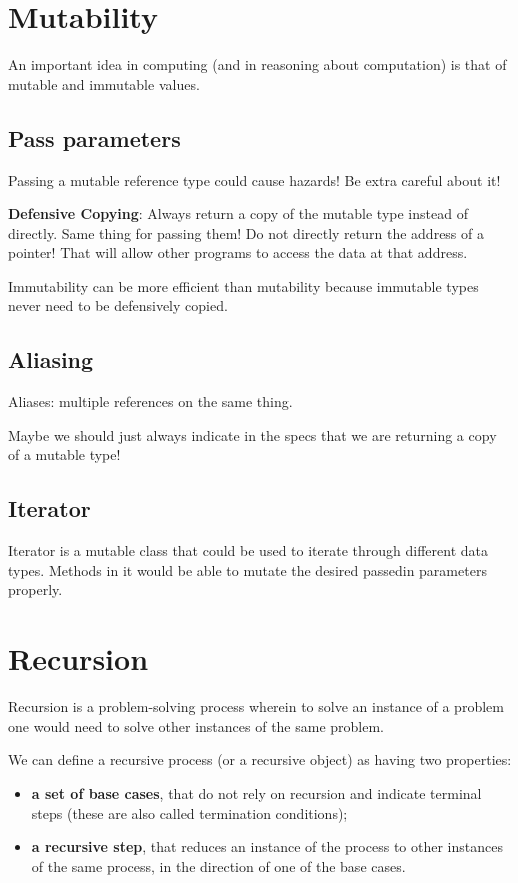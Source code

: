\documentclass[letterpaper,12pt]{article}
\begin{document}
\section{Mutability}
An important idea in computing (and in reasoning about computation) is that of
mutable and immutable values.
\subsection{Pass parameters}
Passing a mutable reference type could cause hazards! Be extra careful about
it!

\textbf{Defensive Copying}: Always return a copy of the mutable type instead of directly. Same thing for passing them!
Do not directly return the address of a pointer! That will allow other programs to access the data at that address.

Immutability can be more efficient than mutability because immutable types
never need to be defensively copied.

\subsection{Aliasing}

Aliases: multiple references on the same thing.

Maybe we should just always indicate in the specs that we are returning a copy
of a mutable type!

\subsection{Iterator}

Iterator is a mutable class that could be used to iterate through different
data types. Methods in it would be able to mutate the desired passed\-in
parameters properly.
\section{Recursion}

Recursion is a problem-solving process wherein to solve an instance of a
problem one would need to solve other instances of the same problem.

We can define a recursive process (or a recursive object) as having two
properties:

\begin{itemize}
      \item \textbf{a set of base cases}, that do not rely on recursion and indicate terminal steps (these are also called termination conditions);
      \item \textbf{a recursive step}, that reduces an instance of the process to other instances of the same process, in the direction of one of the base cases.
\end{itemize}
\end{document}
